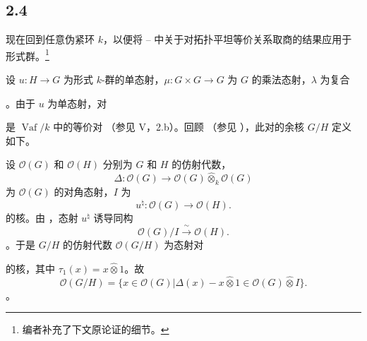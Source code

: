 \subsection*{2.4} \label{sga3:VIIB:2.4}

现在回到任意伪紧环 \(k\)，以便将 -- 中关于对拓扑平坦等价关系取商的结果应用于形式群。\footnote{\label{sga3:VIIB:nde:90}编者补充了下文原论证的细节。}

设 \(u:H\to G\) 为形式 \(k\)-群的单态射，\(\mu:G\times G\to G\) 为 \(G\) 的乘法态射，\(\lambda\) 为复合\begin{center} \label{sga3:VIIB:2.4:lambda-composite} \end{center}。由于 \(u\) 为单态射，对\begin{center} \label{sga3:VIIB:2.4:equivalence-pair} \end{center}是 \(\operatorname{Vaf}/k\) 中的等价对 \textup{（参见 V，2.b）}。回顾 \textup{（参见 ）}，此对的余核 \(G/H\) 定义如下。

设 \(\mathcal O(G)\) 和 \(\mathcal O(H)\) 分别为 \(G\) 和 \(H\) 的仿射代数，\[
  \Delta:\mathcal O(G)
  \longrightarrow
  \mathcal O(G)\widehat\otimes_k\mathcal O(G)
\] 为 \(\mathcal O(G)\) 的对角态射，\(I\) 为 \[
  u^\natural:\mathcal O(G)\longrightarrow\mathcal O(H).
\] 的核。由 ，态射 \(u^\natural\) 诱导同构 \[
  \mathcal O(G)/I\xrightarrow{\ \sim\ }\mathcal O(H).
\]。于是 \(G/H\) 的仿射代数 \(\mathcal O(G/H)\) 为态射对\begin{center} \label{sga3:VIIB:2.4:affine-equalizer-pair} \end{center}的核，其中 \(\tau_1(x)=x\widehat\otimes1\)。故 \[
  \mathcal O(G/H)
  =
  \bigl\{
    x\in\mathcal O(G)
    \mathrel{\big|}
    \Delta(x)-x\widehat\otimes1
    \in\mathcal O(G)\widehat\otimes I
  \bigr\}.
\]。

